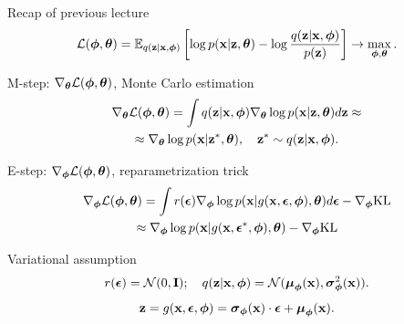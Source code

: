 \begin{frame}{Recap of previous lecture}
	\vspace{-0.3cm}
	\[
		 \mathcal{L} (\bphi, \btheta)  = \mathbb{E}_{q(\bz | \bx, \bphi)} \left[\log p(\bx | \bz, \btheta) - \log \frac{q(\bz | \bx, \bphi)}{p(\bz)} \right] \rightarrow \max_{\bphi, \btheta}.
	\]	
	\vspace{-0.3cm}
	\begin{block}{M-step: $\nabla_{\btheta} \mathcal{L}(\bphi, \btheta)$, Monte Carlo estimation}
		\vspace{-0.8cm}
		\begin{multline*}
			\nabla_{\btheta} \mathcal{L} (\bphi, \btheta)
			= \int q(\bz|\bx, \bphi) \nabla_{\btheta}\log p(\bx|\bz, \btheta) d \bz \approx  \\
			\approx \nabla_{\btheta}\log p(\bx|\bz^*, \btheta), \quad \bz^* \sim q(\bz|\bx, \bphi).
		\end{multline*}
		\vspace{-0.7cm}
	\end{block}
	\begin{block}{E-step: $\nabla_{\bphi} \mathcal{L}(\bphi, \btheta)$, reparametrization trick}
		\vspace{-0.8cm}
		\begin{multline*}
			\nabla_{\bphi} \mathcal{L} (\bphi, \btheta) = \int r(\bepsilon) \nabla_{\bphi} \log p(\bx | g(\bx, \bepsilon, \bphi), \btheta) d\bepsilon  - \nabla_{\bphi} \text{KL}
			\\ \approx \nabla_{\bphi} \log p(\bx | g(\bx, \bepsilon^*, \bphi), \btheta)  - \nabla_{\bphi} \text{KL}
		\end{multline*}
		\vspace{-0.5cm}
	\end{block}
	\vspace{-0.5cm}
	
	\begin{block}{Variational assumption}
		\vspace{-0.3cm}
		\[
			r(\bepsilon) = \mathcal{N}(0, \bI); \quad  q(\bz| \bx, \bphi) = \mathcal{N} (\bmu_{\bphi}(\bx), \bsigma^2_{\bphi}(\bx)).
		\]
		\[
			\bz = g(\bx, \bepsilon, \bphi) = \bsigma_{\bphi}(\bx) \cdot \bepsilon + \bmu_{\bphi}(\bx).
		\]
	\end{block}
\end{frame}
